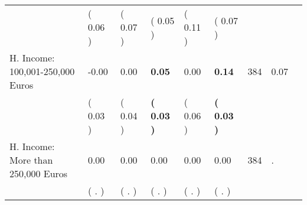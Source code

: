 \begin{tabular}{L{6.2cm} C{1.8cm} C{1.8cm} C{1.8cm} C{1.8cm} C{1.8cm} C{1.8cm} C{0.3cm} C{0.3cm}}
 & (     0.06 ) & (     0.07 ) & (     0.05 ) & (     0.11 ) & (     0.07 )  & \\
H. Income: 100,001-250,000 Euros &     -0.00 &      0.00 & \textbf{     0.05} &      0.00 & \textbf{     0.14}  & 384 &       0.07 \\ 
 & (     0.03 ) & (     0.04 ) & \textbf{(     0.03 )} & (     0.06 ) & \textbf{(     0.03 )}  & \\
H. Income: More than 250,000 Euros &      0.00 &      0.00 &      0.00 &      0.00 &      0.00  & 384 &          . \\ 
 & (        . ) & (        . ) & (        . ) & (        . ) & (        . )  & \\
\bottomrule
\end{tabular}
